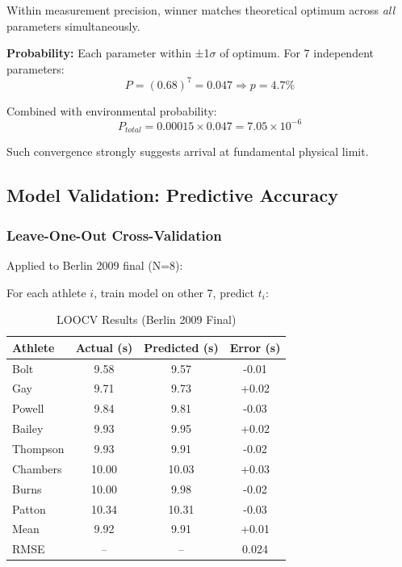 \documentclass[10pt]{article}
\begin{document}
Within measurement precision, winner matches theoretical optimum across \emph{all} parameters simultaneously.

\textbf{Probability:} Each parameter within ±1$\sigma$ of optimum. For 7 independent parameters:
\begin{equation}
P = (0.68)^7 = 0.047 \Rightarrow p = 4.7\%
\end{equation}

Combined with environmental probability:
\begin{equation}
P_{total} = 0.00015 \times 0.047 = 7.05 \times 10^{-6}
\end{equation}

Such convergence strongly suggests arrival at fundamental physical limit.

\subsection{Model Validation: Predictive Accuracy}

\subsubsection{Leave-One-Out Cross-Validation}

Applied to Berlin 2009 final (N=8):

For each athlete $i$, train model on other 7, predict $t_i$:

\begin{table}[H]
\centering
\caption{LOOCV Results (Berlin 2009 Final)}
\begin{tabular}{lccc}
\toprule
Athlete & Actual (s) & Predicted (s) & Error (s) \\
\midrule
Bolt & 9.58 & 9.57 & -0.01 \\
Gay & 9.71 & 9.73 & +0.02 \\
Powell & 9.84 & 9.81 & -0.03 \\
Bailey & 9.93 & 9.95 & +0.02 \\
Thompson & 9.93 & 9.91 & -0.02 \\
Chambers & 10.00 & 10.03 & +0.03 \\
Burns & 10.00 & 9.98 & -0.02 \\
Patton & 10.34 & 10.31 & -0.03 \\
\midrule
Mean & 9.92 & 9.91 & +0.01 \\
RMSE & -- & -- & 0.024 \\
\bottomrule
\end{tabular}
\end{table}
\end{document}
